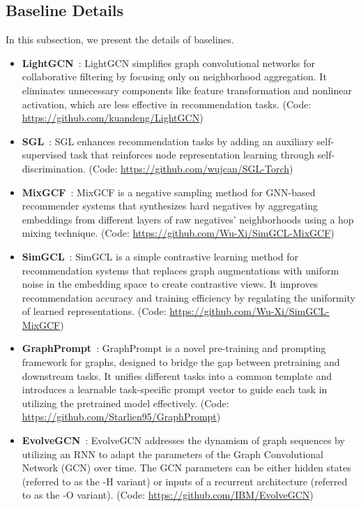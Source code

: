 \documentclass[letterpaper]{article} %
\begin{document}
\subsection{Baseline Details}
\label{appendix:baselines}
In this subsection, we present the details of baselines.


\begin{itemize}[leftmargin=*]
    \item \textbf{LightGCN}~\cite{he2020lightgcn}: LightGCN simplifies graph convolutional networks for collaborative filtering by focusing only on neighborhood aggregation. It eliminates unnecessary components like feature transformation and nonlinear activation, which are less effective in recommendation tasks. (Code: \url{https://github.com/kuandeng/LightGCN})

    \item \textbf{SGL}~\cite{sgl}: 
    SGL enhances recommendation tasks by adding an auxiliary self-supervised task that reinforces node representation learning through self-discrimination. (Code: \url{https://github.com/wujcan/SGL-Torch})
    
    \item \textbf{MixGCF}~\cite{huang2021mixgcf}: MixGCF is a negative sampling method for GNN-based recommender systems that synthesizes hard negatives by aggregating embeddings from different layers of raw negatives' neighborhoods using a hop mixing technique. (Code: \url{https://github.com/Wu-Xi/SimGCL-MixGCF})
    
    \item \textbf{SimGCL}~\cite{simgcl}: SimGCL is a simple contrastive learning method for recommendation systems that replaces graph augmentations with uniform noise in the embedding space to create contrastive views. It improves recommendation accuracy and training efficiency by regulating the uniformity of learned representations.
 (Code: \url{https://github.com/Wu-Xi/SimGCL-MixGCF})

    \item \textbf{GraphPrompt}~\cite{graphprompt}: GraphPrompt is a novel pre-training and prompting framework for graphs, designed to bridge the gap between pretraining and downstream tasks. It unifies different tasks into a common template and introduces a learnable task-specific prompt vector to guide each task in utilizing the pretrained model effectively. (Code: \url{https://github.com/Starlien95/GraphPrompt})
    
    \item \textbf{EvolveGCN}~\cite{pareja2020evolvegcn}: EvolveGCN addresses the dynamism of graph sequences by utilizing an RNN to adapt the parameters of the Graph Convolutional Network (GCN) over time. The GCN parameters can be either hidden states (referred to as the -H variant) or inputs of a recurrent architecture (referred to as the -O variant). (Code: \url{https://github.com/IBM/EvolveGCN})


\end{itemize}
\end{document}
